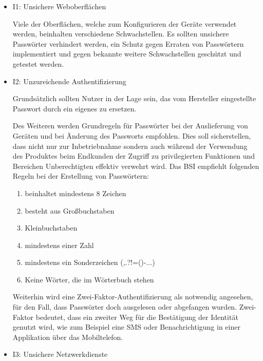         \begin{itemize}
            \item I1: Unsichere Weboberflächen
            
            Viele der Oberflächen, welche zum Konfigurieren der Geräte verwendet werden, beinhalten verschiedene Schwachstellen.
            Es sollten unsichere Passwörter verhindert werden, ein Schutz gegen Erraten von Passwörtern implementiert und gegen bekannte weitere Schwachstellen geschützt und getestet werden.
            
            \item I2: Unzureichende Authentifizierung
            
            Grundsätzlich sollten Nutzer in der Lage sein, das vom Hersteller eingestellte Passwort durch ein eigenes zu ersetzen.
            
            Des Weiteren werden Grundregeln für Passwörter bei der Auslieferung von Geräten und bei Änderung des Passworts empfohlen. Dies soll sicherstellen, dass nicht nur zur Inbetriebnahme sondern auch während der Verwendung des Produktes beim Endkunden der Zugriff zu privilegierten Funktionen und Bereichen Unberechtigten effektiv verwehrt wird. Das \ac{BSI} \cite{bundesamt_fuer_sicherheit_in_der_informationstechnik_2018} 
            empfiehlt folgenden Regeln bei der Erstellung von Passwörtern:
            \begin{enumerate}
                \item beinhaltet mindestens 8 Zeichen
                \item besteht aus Großbuchstaben
                \item Kleinbuchstaben
                \item mindestens einer Zahl
                \item mindestens ein Sonderzeichen (,.?!=()-...)
                \item Keine Wörter, die im Wörterbuch stehen
            \end{enumerate}
            
            Weiterhin wird eine Zwei-Faktor-Authentifizierung als notwendig angesehen, für den Fall, dass Passwörter doch ausgelesen oder abgefangen wurden. Zwei-Faktor bedeutet, dass ein zweiter Weg für die Bestätigung der Identität genutzt wird, wie zum Beispiel eine SMS oder Benachrichtigung in einer Applikation über das Mobiltelefon.
            
            \item I3: Unsichere Netzwerkdienste
            

\end{itemize}
